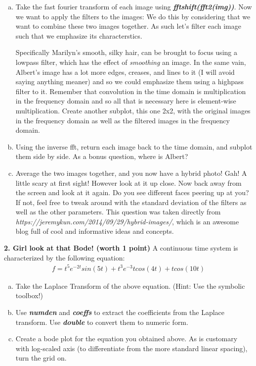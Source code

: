 \documentclass[11pt]{article}
\begin{document}
\begin{enumerate}[a.]
    \item Take the fast fourier transform of each image using
    \textit{\textbf{fftshift(fft2(img))}}.
    Now we want to apply the filters to the images:
    We do this by considering that we want to combine these two images together.
    As such let's filter each image such that we emphasize its characterstics.

    Specifically Marilyn's smooth, silky hair, can be brought to focus using a
    lowpass filter, which has the effect of \textit{smoothing} an image.
    In the same vain, Albert's image has a lot more edges, creases, and lines to it 
    (I will avoid saying anything meaner) and so we could emphasize them using a
    highpass filter to it.
    Remember that convolution in the time domain is multiplication in the frequency domain
    and so all that is necessary here is element-wise multiplication.
    Create another subplot, this one 2x2, with the original images in the frequency domain
    as well as the filtered images in the frequency domain.

    \item Using the inverse fft,
    return each image back to the time domain, and subplot them side by side.
    As a bonus question, where is Albert?

    \item Average the two images together, and you now have a hybrid photo!
    Gah! A little scary at first sight!
    However look at it up close. Now back away from the screen and look at it again.
    Do you see different faces peering up at you?
    If not, feel free to tweak around with the standard deviation of the filters as 
    well as the other parameters.
    This question was taken directly from 
    \textit{https://jeremykun.com/2014/09/29/hybrid-images/},
    which is an awesome blog full of cool and informative ideas and concepts. 
\end{enumerate}


\noindent
\newline
\textbf{2. Girl look at that Bode! (worth 1 point)}
A continuous time system is characterized by the following equation:
\begin{align*}
    f=t^5e^{−2t}sin(5t) +t^3e^{−3}tcos(4t) +tcos(10t)
\end{align*}

\begin{enumerate}[a.]
    \item Take the Laplace Transform of the above equation. 
    (Hint: Use the symbolic toolbox!)
    
    \item Use \textbf{\textit{numden}} and \textbf{\textit{coeffs}}
    to extract the coefficients from the Laplace transform. 
    Use \textbf{\textit{double}} to convert them to numeric form.
    
    \item Create a bode plot for the equation you obtained above. 
    As is customary with log-scaled axis (to differentiate from the
    more standard linear spacing), turn the grid on.
\end{enumerate}
\end{document}
